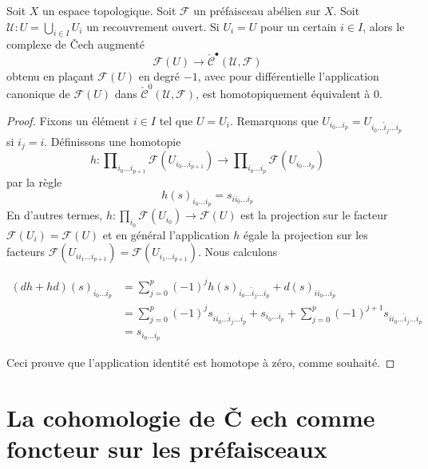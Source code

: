 \begin{lemma}

\label{lemma-cech-trivial}
Soit $X$ un espace topologique. Soit $\mathcal{F}$ un préfaisceau abélien sur $X$. Soit $\mathcal{U} : U = \bigcup_{i \in I} U_i$ un recouvrement ouvert. Si $U_i = U$ pour un certain $i \in I$, alors le complexe de {\v C}ech augmenté $$
\mathcal{F}(U) \to \check{\mathcal{C}}^\bullet(\mathcal{U}, \mathcal{F})
$$ obtenu en plaçant $\mathcal{F}(U)$ en degré $-1$, avec pour différentielle l'application canonique de $\mathcal{F}(U)$ dans $\check{\mathcal{C}}^0(\mathcal{U}, \mathcal{F})$, est homotopiquement équivalent à $0$.
\end{lemma}

\begin{proof}

Fixons un élément $i \in I$ tel que $U = U_i$. Remarquons que
$U_{i_0 \ldots i_p} = U_{i_0 \ldots \hat i_j \ldots i_p}$ si $i_j = i$. Définissons une homotopie
$$
h :
\prod\nolimits_{i_0 \ldots i_{p + 1}} \mathcal{F}(U_{i_0 \ldots i_{p + 1}})
\longrightarrow
\prod\nolimits_{i_0 \ldots i_p} \mathcal{F}(U_{i_0 \ldots i_p})
$$
par la règle
$$
h(s)_{i_0 \ldots i_p} = s_{i i_0 \ldots i_p}
$$
En d'autres termes, $h : \prod_{i_0} \mathcal{F}(U_{i_0}) \to \mathcal{F}(U)$
est la projection sur le facteur $\mathcal{F}(U_i) = \mathcal{F}(U)$
et en général l'application $h$ égale la projection sur les facteurs
$\mathcal{F}(U_{i i_1 \ldots i_{p + 1}}) =
\mathcal{F}(U_{i_1 \ldots i_{p + 1}})$. Nous calculons

\begin{align*}
(dh + hd)(s)_{i_0 \ldots i_p}
& =
\sum\nolimits_{j = 0}^p
(-1)^j
h(s)_{i_0 \ldots \hat i_j \ldots i_p}
+
d(s)_{i i_0 \ldots i_p}\\
& =
\sum\nolimits_{j = 0}^p
(-1)^j
s_{i i_0 \ldots \hat i_j \ldots i_p}
+
s_{i_0 \ldots i_p}
+
\sum\nolimits_{j = 0}^p
(-1)^{j + 1}
s_{i i_0 \ldots \hat i_j \ldots i_p} \\
& =
s_{i_0 \ldots i_p}
\end{align*}

Ceci prouve que l'application identité est homotope à zéro, comme souhaité.

\end{proof}





\section{La cohomologie de {\v C}
ech comme foncteur sur les préfaisceaux}
\label{section-cech-functor}

